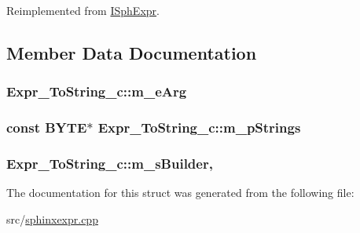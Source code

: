 Reimplemented from \hyperlink{structISphExpr_a5e1268916a46b2b9cabb93d30ca5c40c}{I\-Sph\-Expr}.



\subsection{Member Data Documentation}
\hypertarget{structExpr__ToString__c_abe854c1bfcf68fba7c5f8ad0468dd4c2}{
\subsubsection[{m\-\_\-e\-Arg}]{ Expr\-\_\-\-To\-String\-\_\-c\-::m\-\_\-e\-Arg\hspace{0.3cm}{\ttfamily [protected]}}}\label{structExpr__ToString__c_abe854c1bfcf68fba7c5f8ad0468dd4c2}
\hypertarget{structExpr__ToString__c_ad820faea70bcaa47ab734d63aa66e020}{
\subsubsection[{m\-\_\-p\-Strings}]{\setlength{\rightskip}{0pt plus 5cm}const {\bf B\-Y\-T\-E}$\ast$ Expr\-\_\-\-To\-String\-\_\-c\-::m\-\_\-p\-Strings\hspace{0.3cm}{\ttfamily [protected]}}}\label{structExpr__ToString__c_ad820faea70bcaa47ab734d63aa66e020}
\hypertarget{structExpr__ToString__c_a404938b4d5a48a3fdf5d1694b168f240}{
\subsubsection[{m\-\_\-s\-Builder}]{ Expr\-\_\-\-To\-String\-\_\-c\-::m\-\_\-s\-Builder\hspace{0.3cm}{\ttfamily [mutable]}, {\ttfamily [protected]}}}\label{structExpr__ToString__c_a404938b4d5a48a3fdf5d1694b168f240}


The documentation for this struct was generated from the following file\-:\begin{DoxyCompactItemize}
\item 
src/\hyperlink{sphinxexpr_8cpp}{sphinxexpr.\-cpp}\end{DoxyCompactItemize}
